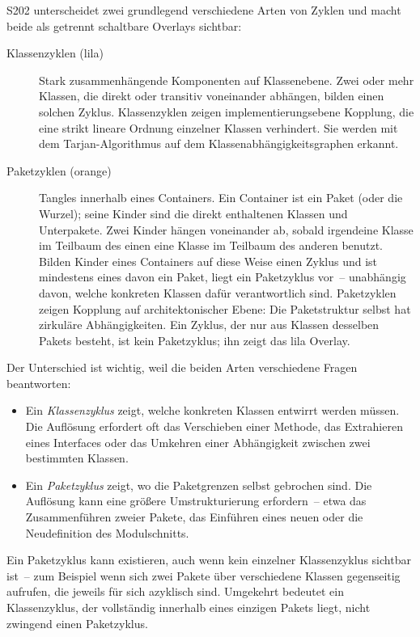 \documentclass[a4paper,11pt]{article}
\begin{document}
S202 unterscheidet zwei grundlegend verschiedene Arten von Zyklen und macht
beide als getrennt schaltbare Overlays sichtbar:

\begin{description}
  \item[Klassenzyklen (lila)] Stark zusammenh\"angende Komponenten auf Klassenebene.
        Zwei oder mehr Klassen, die direkt oder transitiv voneinander abh\"angen,
        bilden einen solchen Zyklus. Klassenzyklen zeigen implementierungsebene
        Kopplung, die eine strikt lineare Ordnung einzelner Klassen verhindert.
        Sie werden mit dem Tarjan-Algorithmus auf dem Klassenabh\"angigkeitsgraphen
        erkannt.
  \item[Paketzyklen (orange)] Tangles innerhalb eines Containers. Ein
        Container ist ein Paket (oder die Wurzel); seine Kinder sind die direkt
        enthaltenen Klassen und Unterpakete. Zwei Kinder h\"angen voneinander
        ab, sobald irgendeine Klasse im Teilbaum des einen eine Klasse im
        Teilbaum des anderen benutzt. Bilden Kinder eines Containers auf diese
        Weise einen Zyklus und ist mindestens eines davon ein Paket, liegt ein
        Paketzyklus vor~-- unabh\"angig davon, welche konkreten Klassen daf\"ur
        verantwortlich sind. Paketzyklen zeigen Kopplung auf architektonischer
        Ebene: Die Paketstruktur selbst hat zirkul\"are Abh\"angigkeiten.
        Ein Zyklus, der nur aus Klassen desselben Pakets besteht, ist kein
        Paketzyklus; ihn zeigt das lila Overlay.
\end{description}

Der Unterschied ist wichtig, weil die beiden Arten verschiedene Fragen beantworten:

\begin{itemize}
  \item Ein \emph{Klassenzyklus} zeigt, welche konkreten Klassen entwirrt werden
        m\"ussen. Die Aufl\"osung erfordert oft das Verschieben einer Methode,
        das Extrahieren eines Interfaces oder das Umkehren einer Abh\"angigkeit
        zwischen zwei bestimmten Klassen.
  \item Ein \emph{Paketzyklus} zeigt, wo die Paketgrenzen selbst gebrochen sind.
        Die Aufl\"osung kann eine gr\"o\ss{}ere Umstrukturierung erfordern~--
        etwa das Zusammenf\"uhren zweier Pakete, das Einf\"uhren eines neuen oder
        die Neudefinition des Modulschnitts.
\end{itemize}

Ein Paketzyklus kann existieren, auch wenn kein einzelner Klassenzyklus sichtbar
ist~-- zum Beispiel wenn sich zwei Pakete \"uber verschiedene Klassen gegenseitig
aufrufen, die jeweils f\"ur sich azyklisch sind. Umgekehrt bedeutet ein
Klassenzyklus, der vollst\"andig innerhalb eines einzigen Pakets liegt, nicht
zwingend einen Paketzyklus.
\end{document}
